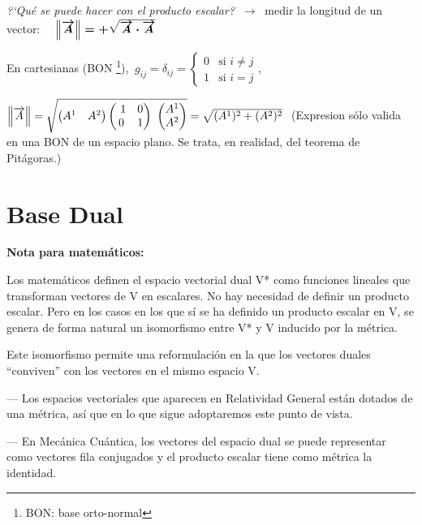  \emph{?`Qué se puede hacer con el producto escalar?} $\ \to \ $ medir la longitud de un vector: $\quad \boldsymbol{ \norm{\overrightarrow A}=+\sqrt{\overrightarrow A \cdot \overrightarrow A} }$
 
 En cartesianas (BON \footnote{BON: base orto-normal}), $\ g_{ij}=\delta_{ij}=\begin{cases} 0 & \text{si } i\neq j \\ 1 & \text{si } i=j \end{cases}$,
 
 $ \norm{\overrightarrow A} = \sqrt{\left( \begin{matrix}  A^1&A^2 \end{matrix} \right) \left( \begin{matrix} \ 1 & 0 \\ 0 & 1 \end{matrix} \right) \  \left( \begin{matrix} A^1 \\ A^2 \end{matrix} \right)} =\sqrt{(A^1)^2+(A^2)^2}\ $ (Expresion sólo valida en una BON de un espacio plano. Se trata, en realidad, del teorema de Pitágoras.)
 
\section{Base Dual} 

\begin{resumen}
\vspace{-10mm}
\textcolor{gris}{\textbf{Nota para matemáticos:}}

\textcolor{gris}{Los matemáticos definen el espacio vectorial dual V* como funciones lineales que transforman vectores de V en escalares. No hay necesidad de definir un producto escalar. Pero en los casos en los que sí se ha definido un producto escalar en V, se genera de forma natural un isomorfismo entre V* y V inducido por la métrica.}

\textcolor{gris}{ Este isomorfismo permite una reformulación en la que los vectores duales ``conviven'' con los vectores en el mismo espacio V.}
\vspace{-10mm}
\begin{resumen} 
\textcolor{gris}{--- Los espacios vectoriales que aparecen en Relatividad General están dotados de una métrica, así que en lo que sigue adoptaremos este punto de vista.}

\textcolor{gris}{--- En Mecánica Cuántica, los vectores del espacio dual se puede representar como vectores fila conjugados y el producto escalar tiene como métrica la identidad.}
\end{resumen}
\end{resumen}

